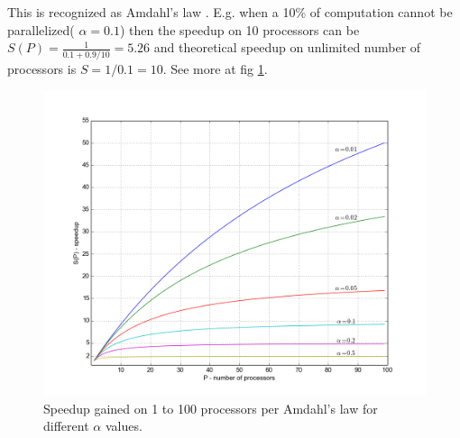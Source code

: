 This is recognized as Amdahl's law \cite{Amdahl1967}. E.g. when a 10\% of computation cannot be parallelized( $\alpha = 0.1$) then the speedup on 10 processors can be $S(P) = \frac{1}{0.1+0.9/10} = 5.26$ and theoretical speedup on unlimited number of processors is $S = 1/0.1=10$. See more at fig \ref{fig:amdahl}.
\begin{figure}[ht]
    \centering
    \includegraphics[width=1\textwidth]{chapter2/Amdahl.png}
    \caption{Speedup gained on 1 to 100 processors per Amdahl's law for different $\alpha$ values.}
    \label{fig:amdahl}
\end{figure}

